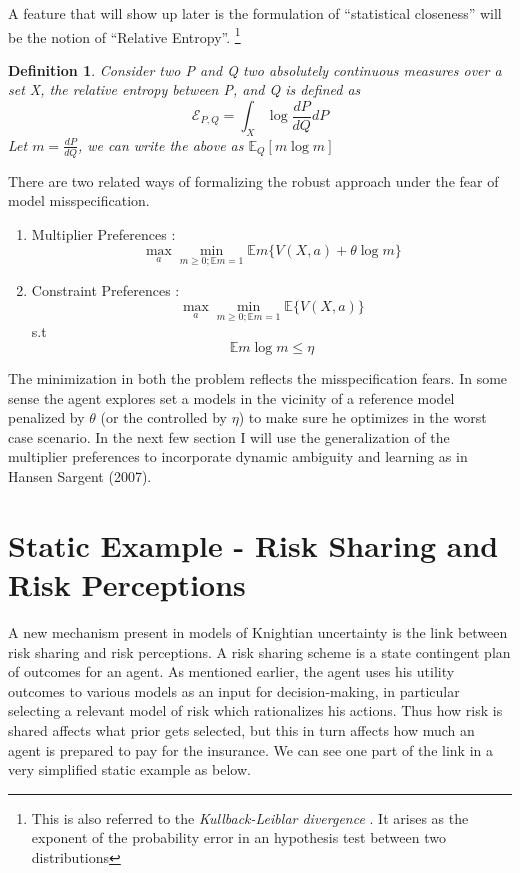 \documentclass[12pt]{article}
\newtheorem{definition}{Definition}
\begin{document}
\noindent A feature that will show up later is the formulation of ``statistical closeness'' will be the notion of ``Relative Entropy''. \footnote{This is also referred to the \emph{Kullback-Leiblar divergence} . It arises as the exponent of the probability error in an hypothesis test between two distributions}
\begin{definition}
Consider two P and Q two absolutely continuous measures over a set X, the relative entropy between P, and Q is defined as 
\[\mathcal{E}_{P,Q} = \int_{X}\log\frac{{dP}}{dQ}dP\]
Let $m=\frac{{dP}}{dQ}$, we can write the above as $\mathbb{E}_Q [m \log m]$
\end{definition}

There are two related ways of formalizing the robust approach under the fear of model misspecification. 
\begin{enumerate}
	\item Multiplier Preferences : \[\max_{a}\min_{m\geq 0; \mathbb{E}m=1} \mathbb{E}m\{V(X,a) + \theta \log m \}\]
	\item Constraint Preferences : \[\max_{a}\min_{m\geq 0; \mathbb{E}m=1} \mathbb{E}\{V(X,a) \}\]
	s.t 
	\[\mathbb{E}m\log m \leq \eta\]
	
\end{enumerate}
The minimization in both the problem reflects the misspecification fears. In some sense the agent explores set a models in the vicinity of a reference model penalized by $\theta$ (or the controlled by $\eta$) to make sure he optimizes in the worst case scenario. In the next few section I will use the generalization of the multiplier preferences to incorporate dynamic ambiguity and learning as in Hansen Sargent (2007).
	
\section{Static Example - Risk Sharing and Risk Perceptions}
A new mechanism present in models of Knightian uncertainty is the link between risk sharing and risk perceptions. A risk sharing scheme is a state contingent plan of outcomes for an agent. As mentioned earlier, the agent uses his utility outcomes to various models as an input for decision-making, in particular selecting a relevant model of risk which rationalizes his actions. Thus how risk is shared affects what prior gets selected, but this in turn affects how much an agent is prepared to pay for the insurance. We can see one part of the link in a very simplified static example as below.
\vspace{10 mm}
\end{document}
